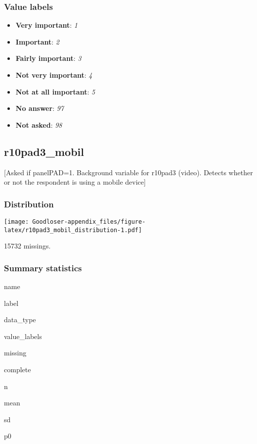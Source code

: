 \documentclass[]{book}
\providecommand{\tightlist}{%
  \setlength{\itemsep}{0pt}\setlength{\parskip}{0pt}}
\begin{document}
\subsubsection{Value labels}\label{r10pad2_labels}

\begin{itemize}
\tightlist
\item
  \textbf{Very important}: \emph{1}
\item
  \textbf{Important}: \emph{2}
\item
  \textbf{Fairly important}: \emph{3}
\item
  \textbf{Not very important}: \emph{4}
\item
  \textbf{Not at all important}: \emph{5}
\item
  \textbf{No answer}: \emph{97}
\item
  \textbf{Not asked}: \emph{98}
\end{itemize}

\subsection{r10pad3\_mobil}\label{r10pad3_mobil}

{[}Asked if panelPAD=1. Background variable for r10pad3 (video). Detects
whether or not the respondent is using a mobile device{]}

\subsubsection{Distribution}\label{r10pad3_mobil_distribution}

\texttt{[image: Goodloser-appendix\_files/figure-latex/r10pad3\_mobil\_distribution-1.pdf]}

15732 missings.

\subsubsection{Summary statistics}\label{r10pad3_mobil_summary}

name

label

data\_type

value\_labels

missing

complete

n

mean

sd

p0
\end{document}
